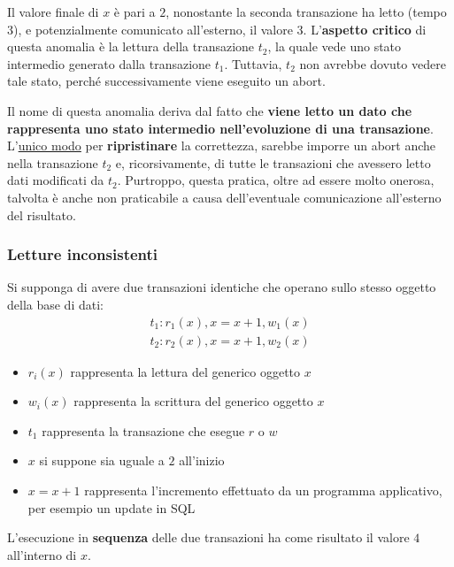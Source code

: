 \documentclass[a4paper]{article}
\begin{document}
	\noindent
	Il valore finale di $x$ è pari a $2$, nonostante la seconda transazione ha letto (tempo $3$), e potenzialmente comunicato all'esterno, il valore $3$. L'\textbf{aspetto critico} di questa anomalia è la lettura della transazione $t_{2}$, la quale vede uno stato intermedio generato dalla transazione $t_{1}$. Tuttavia, $t_{2}$ non avrebbe dovuto vedere tale stato, perché successivamente viene eseguito un \textsf{abort}.\newline
	
	\noindent
	Il nome di questa anomalia deriva dal fatto che \textbf{viene letto un dato che rappresenta uno stato intermedio nell'evoluzione di una transazione}. L'\underline{unico modo} per \textbf{ripristinare} la correttezza, sarebbe imporre un \textsf{abort} anche nella transazione $t_{2}$ e, ricorsivamente, di tutte le transazioni che avessero letto dati modificati da $t_{2}$. Purtroppo, questa pratica, oltre ad essere molto onerosa, talvolta è anche non praticabile a causa dell'eventuale comunicazione all'esterno del risultato.\newpage
	
	\subsubsection{Letture inconsistenti}\label{par: letture inconsistenti}
	
	Si supponga di avere due transazioni identiche che operano sullo stesso oggetto della base di dati:
	\begin{gather*}
		t_{1} : r_{1}\left(x\right), x = x + 1, w_{1}\left(x\right) \\
		t_{2} : r_{2}\left(x\right), x = x + 1, w_{2}\left(x\right)
	\end{gather*}
	\begin{itemize}
		\item $r_{i}\left(x\right)$ rappresenta la lettura del generico oggetto $x$
		\item $w_{i}\left(x\right)$ rappresenta la scrittura del generico oggetto $x$
		\item $t_{1}$ rappresenta la transazione che esegue $r$ o $w$
		\item $x$ si suppone sia uguale a $2$ all'inizio
		\item $x = x+1$ rappresenta l'incremento effettuato da un programma applicativo, per esempio un \textsf{update} in SQL
	\end{itemize}
	L'esecuzione in \textbf{sequenza} delle due transazioni ha come risultato il valore $4$ all'interno di $x$.\newline
	
\end{document}
